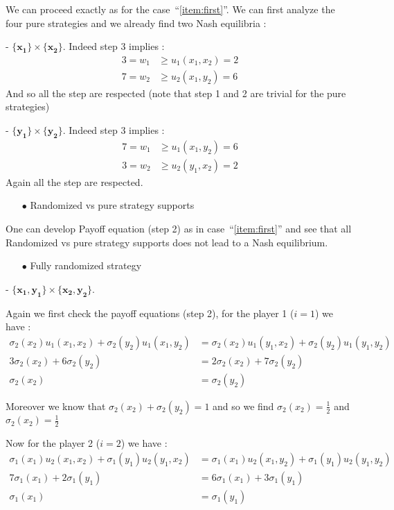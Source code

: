 We can proceed exactly as for the case~``\ref{item:first}''. We can first analyze the four pure strategies and we already find two Nash equilibria :

- $\mathbf{\{x_1\}}\times\mathbf{\{x_2\}}$. Indeed step 3 implies :
\begin{align*}
    3=w_1&\ge u_1(x_1,x_2)=2 \\
    7=w_2&\ge u_2(x_1,y_2)=6 
\end{align*}
And so all the step are respected (note that step 1 and 2 are trivial for the pure strategies) 

- $\mathbf{\{y_1\}}\times\mathbf{\{y_2\}}$. Indeed step 3 implies :
\begin{align*}
    7 =w_1&\ge u_1(x_1,y_2)=6 \\
    3=w_2&\ge u_2(y_1,x_2)=2
\end{align*}
Again all the step are respected.


\begin{itemize}
  \item[$\bullet$] Randomized vs pure strategy supports
\end{itemize}

One can develop Payoff equation (step 2) as in case~``\ref{item:first}'' and see that all Randomized vs pure strategy supports does not lead to a Nash equilibrium.

\begin{itemize}
  \item[$\bullet$] Fully randomized strategy 
\end{itemize}
- $\mathbf{\{x_1,y_1\}}\times\mathbf{\{x_2,y_2\}}$.

Again we first check the payoff equations (step 2), for the player 1 ($i=1$) we have : 
\begin{align*}
 \sigma_2(x_2)u_1(x_1,x_2) + \sigma_2(y_2)u_1(x_1,y_2) &= \sigma_2(x_2)u_1(y_1,x_2) + \sigma_2(y_2)u_1(y_1,y_2) \\
 3\sigma_2(x_2)+6\sigma_2(y_2)&= 2\sigma_2(x_2) + 7\sigma_2(y_2) \\
 \sigma_2(x_2)&=\sigma_2(y_2)
\end{align*}

Moreover we know that $\sigma_2(x_2) + \sigma_2(y_2) = 1$ and so we find $\sigma_2(x_2)=\frac{1}{2}$ and $\sigma_2(x_2)=\frac{1}{2}$

Now for the player 2 ($i=2$) we have : 
\begin{align*}
 \sigma_1(x_1)u_2(x_1,x_2) + \sigma_1(y_1)u_2(y_1,x_2) &= \sigma_1(x_1)u_2(x_1,y_2) + \sigma_1(y_1)u_2(y_1,y_2) \\
 7\sigma_1(x_1)+2\sigma_1(y_1)&= 6\sigma_1(x_1) + 3\sigma_1(y_1) \\
 \sigma_1(x_1)&=\sigma_1(y_1)
\end{align*}

